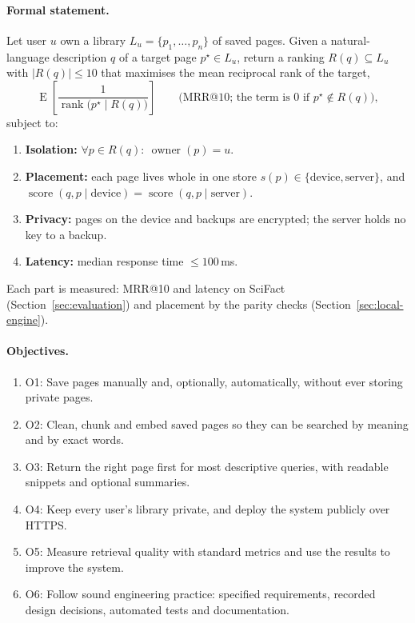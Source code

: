 \paragraph{Formal statement.} Let user $u$ own a library
$L_u = \{p_1, \dots, p_n\}$ of saved pages. Given a natural-language
description $q$ of a target page $p^{\star} \in L_u$, return a ranking
$R(q) \subseteq L_u$ with $|R(q)| \le 10$ that maximises the mean reciprocal
rank of the target,
\[
  \operatorname{E}\left[\frac{1}{\operatorname{rank}\bigl(p^{\star} \mid R(q)\bigr)}\right]
  \qquad \text{(MRR@10; the term is 0 if } p^{\star} \notin R(q)\text{)},
\]
subject to:
\begin{enumerate}[nosep]
  \item \textbf{Isolation:} $\forall p \in R(q):\ \operatorname{owner}(p) = u$.
  \item \textbf{Placement:} each page lives whole in one store
  $s(p) \in \{\text{device}, \text{server}\}$, and
  $\operatorname{score}(q, p \mid \text{device}) = \operatorname{score}(q, p \mid \text{server})$.
  \item \textbf{Privacy:} pages on the device and backups are encrypted; the
  server holds no key to a backup.
  \item \textbf{Latency:} median response time $\le 100$\,ms.
\end{enumerate}
Each part is measured: MRR@10 and latency on SciFact
(Section~\ref{sec:evaluation}) and placement by the parity checks
(Section~\ref{sec:local-engine}).

\paragraph{Objectives.}
\begin{enumerate}
  \item O1: Save pages manually and, optionally, automatically, without ever
  storing private pages.
  \item O2: Clean, chunk and embed saved pages so they can be searched by
  meaning and by exact words.
  \item O3: Return the right page first for most descriptive queries, with
  readable snippets and optional summaries.
  \item O4: Keep every user's library private, and deploy the system
  publicly over HTTPS.
  \item O5: Measure retrieval quality with standard metrics and use the
  results to improve the system.
  \item O6: Follow sound engineering practice: specified requirements,
  recorded design decisions, automated tests and documentation.
\end{enumerate}

